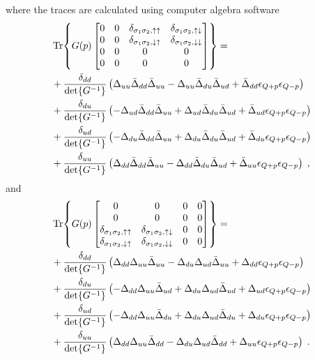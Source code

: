 \documentclass{article}
\begin{document}
where the traces are calculated using computer algebra software
\begin{align}
&\Tr{G(p) 
    \begin{bmatrix}
    0 & 0 & \delta_{\sigma_1 \sigma_2, \uparrow \uparrow} & \delta_{\sigma_1 \sigma_2, \uparrow \downarrow} \\
    0 & 0 & \delta_{\sigma_1 \sigma_2, \downarrow \uparrow} & \delta_{\sigma_1 \sigma_2, \downarrow \downarrow} \\ 
    0 & 0 & 0 & 0 \\ 
    0 & 0 & 0 & 0
    \end{bmatrix}}= \\ 
                &+ \frac{\delta_{dd}}{\det{G^{-1}}} \left(\Delta_{uu} \bar{\Delta}_{dd} \bar{\Delta}_{uu} - \Delta_{uu} \bar{\Delta}_{du} \bar{\Delta}_{ud} + \bar{\Delta}_{dd} \epsilon_{Q+p} \epsilon_{Q-p}\right) \nonumber\\ 
                &+ \frac{\delta_{du}}{\det{G^{-1}}} \left(- \Delta_{ud} \bar{\Delta}_{dd} \bar{\Delta}_{uu} + \Delta_{ud} \bar{\Delta}_{du} \bar{\Delta}_{ud} + \bar{\Delta}_{ud} \epsilon_{Q+p} \epsilon_{Q-p}\right) \nonumber\\
                &+ \frac{\delta_{ud}}{\det{G^{-1}}} \left(- \Delta_{du} \bar{\Delta}_{dd} \bar{\Delta}_{uu} + \Delta_{du} \bar{\Delta}_{du} \bar{\Delta}_{ud} + \bar{\Delta}_{du} \epsilon_{Q+p} \epsilon_{Q-p}\right) \nonumber\\
                &+ \frac{\delta_{uu}}{\det{G^{-1}}} \left(\Delta_{dd} \bar{\Delta}_{dd} \bar{\Delta}_{uu} - \Delta_{dd} \bar{\Delta}_{du} \bar{\Delta}_{ud} + \bar{\Delta}_{uu} \epsilon_{Q+p} \epsilon_{Q-p}\right) \;,\nonumber
\end{align}
and
\begin{align}
    &\Tr{G(p) 
    \begin{bmatrix}
    0 & 0 & 0 & 0 \\
    0 & 0 & 0 & 0 \\ 
    \delta_{\sigma_1 \sigma_2, \uparrow \uparrow} & \delta_{\sigma_1 \sigma_2, \uparrow \downarrow} & 0 & 0 \\ 
    \delta_{\sigma_1 \sigma_2, \downarrow \uparrow} & \delta_{\sigma_1 \sigma_2, \downarrow \downarrow} & 0 & 0
    \end{bmatrix}}= \\ 
    &+ \frac{\delta_{dd}}{\det{G^{-1}}} \left(\Delta_{dd} \Delta_{uu} \bar{\Delta}_{uu}  - \Delta_{du} \Delta_{ud} \bar{\Delta}_{uu} + \Delta_{dd} \epsilon_{Q+p} \epsilon_{Q-p}\right)\nonumber \\
    &+ \frac{\delta_{du}}{\det{G^{-1}}} \left(- \Delta_{dd} \Delta_{uu} \bar{\Delta}_{ud} + \Delta_{du} \Delta_{ud} \bar{\Delta}_{ud} + \Delta_{ud} \epsilon_{Q+p} \epsilon_{Q-p}\right)\nonumber \\
    &+ \frac{\delta_{ud}}{\det{G^{-1}}} \left(- \Delta_{dd} \Delta_{uu} \bar{\Delta}_{du} + \Delta_{du} \Delta_{ud} \bar{\Delta}_{du} + \Delta_{du} \epsilon_{Q+p} \epsilon_{Q-p}\right)\nonumber \\
    &+ \frac{\delta_{uu}}{\det{G^{-1}}} \left(\Delta_{dd} \Delta_{uu} \bar{\Delta}_{dd} - \Delta_{du} \Delta_{ud} \bar{\Delta}_{dd} + \Delta_{uu} \epsilon_{Q+p} \epsilon_{Q-p}\right)\;.
\end{align}
\end{document}
